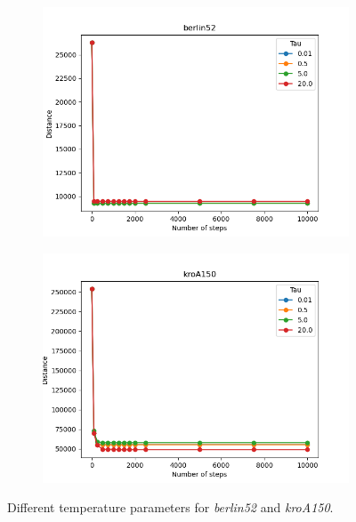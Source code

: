 \begin{figure}[!htb]
	\centering
	\begin{subfigure}{0.45\textwidth}
		\includegraphics[width=\textwidth]{img/berlin52_temperature}
	\end{subfigure}
	\begin{subfigure}{0.45\textwidth}
		\includegraphics[width=\textwidth]{img/kroA150_temperature}
	\end{subfigure}
	\caption{Different temperature parameters for \textit{berlin52} and \textit{kroA150}.}
\end{figure}